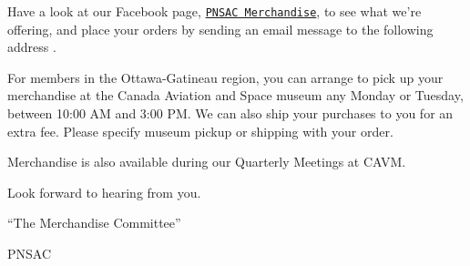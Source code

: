 Have a look at our Facebook page,
{\normalfont\color{blue}\texttt{\href{https://www.facebook.com/media/set/?set=a.610706705637878.1073741851.284829008225651&type=1}{PNSAC
      Merchandise}}}, to see what we're offering, and place your
orders by sending an email message to the following address
.

For members in the Ottawa-Gatineau region, you can arrange to pick up
your merchandise at the Canada Aviation and Space museum any Monday or
Tuesday, between 10:00 AM and 3:00 PM. We can also ship your purchases
to you for an extra fee. Please specify museum pickup or shipping with
your order.

Merchandise is also available during our Quarterly Meetings
at CAVM.

Look forward to hearing from you.

``The Merchandise Committee''

 



\begin{footnotesize}
    \raggedleft PNSAC\\
\end{footnotesize}




